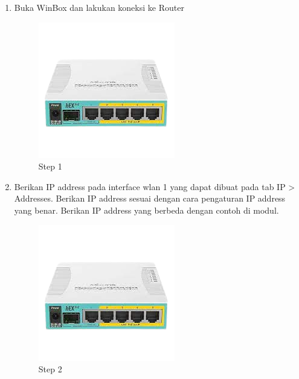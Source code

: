 \begin{enumerate}
	\item Buka WinBox dan lakukan koneksi ke Router
	\begin{figure}[H]
		\centering
		\includegraphics[width=0.5\linewidth]{P1/img/contoh.png}
		\caption{Step 1}
		\label{fig:gambar5}
	\end{figure}

	\item Berikan IP address pada interface wlan 1 yang dapat dibuat pada tab IP > Addresses. Berikan
	IP address sesuai dengan cara pengaturan IP address yang benar. Berikan IP address yang
	berbeda dengan contoh di modul.
	\begin{figure}[H]
		\centering
		\includegraphics[width=0.5\linewidth]{P1/img/contoh.png}
		\caption{Step 2}
		\label{fig:gambar6}
	\end{figure}


\end{enumerate}
